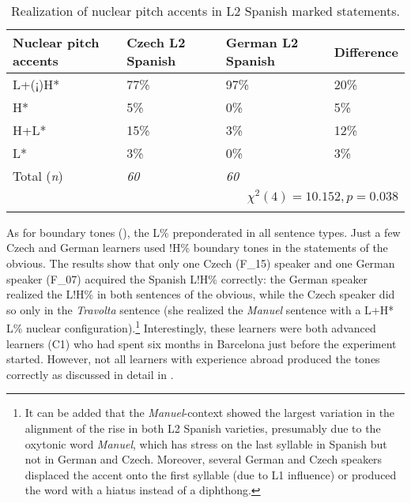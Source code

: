 \begin{table}
\begin{tabularx}{\textwidth}{lYYY}

\lsptoprule

{Nuclear pitch accents} & {Czech L2 Spanish} & {German L2 Spanish} & {Difference}\\
\midrule
L+(¡)H* &  77\% &  97\% &  20\%\\
H* &  5\% &  0\% & 5\%\\
H+L* &  15\% &  3\% &  12\%\\
L* &  3\% &  0\% & 3\%\\
\midrule
Total (\textit{n}) & {\itshape 60} & {\itshape 60} &  \\
\\
\lspbottomrule
\end{tabularx}

\caption{Realization of nuclear pitch accents in L2 Spanish marked statements.}
\label{tab:4.11}
\end{table}

As for boundary tones (), the L\% preponderated in all sentence types. Just a few Czech and German learners used !H\% boundary tones in the statements of the obvious. The results show that only one Czech (F\_15) speaker and one German speaker (F\_07) acquired the Spanish L!H\% correctly: the German speaker realized the L!H\% in both sentences of the obvious, while the Czech speaker did so only in the \textit{Travolta}{} sentence (she realized the \textit{Manuel}{} sentence with a L+H* L\% nuclear configuration).\footnote{It can be added that the \textit{Manuel}{}-context showed the largest variation in the alignment of the rise in both L2 Spanish varieties, presumably due to the oxytonic word \textit{Manuel}, which has stress on the last syllable in Spanish but not in German and Czech. Moreover, several German and Czech speakers displaced the accent onto the first syllable (due to L1 influence) or produced the word with a hiatus instead of a diphthong.} Interestingly, these learners were both advanced learners (C1) who had spent six months in Barcelona just before the experiment started. However, not all learners with experience abroad produced the tones correctly as discussed in detail in \citet{Pešková2022b}.

